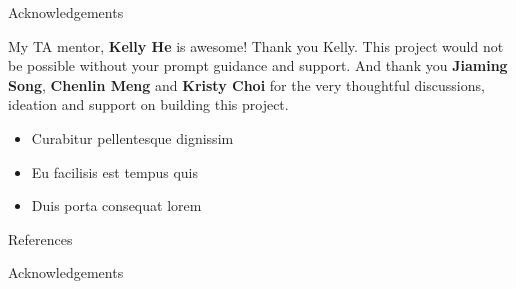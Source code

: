\documentclass[final]{beamer}
\newlength{\onecolwid}
\begin{document}
\begin{frame}[t]
\begin{columns}[t]
\begin{column}{\onecolwid}
\begin{block}{Acknowledgements}

My TA mentor, \textbf{Kelly He} is awesome! Thank you Kelly. This project would not be possible without your prompt guidance and support. And thank you \textbf{Jiaming Song}, \textbf{Chenlin Meng} and \textbf{Kristy Choi} for the very thoughtful discussions, ideation and support on building this project.

\begin{itemize}
\item Curabitur pellentesque dignissim
\item Eu facilisis est tempus quis
\item Duis porta consequat lorem
\end{itemize}

\end{block}


\begin{block}{References}

\nocite{*} %
\small{
\vspace{0.75in}}

\end{block}



\begin{block}{Acknowledgements}

\small{} \\

\end{block}



\end{column}
\end{columns}
\end{frame}
\end{document}
